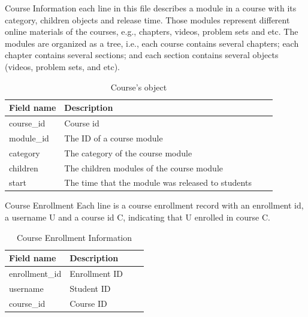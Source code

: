\documentclass[10pt]{beamer}
\begin{document}
    \begin{frame}{Course Information}
        each line in this file describes a module in a course with its category, 
        children objects and release time. Those modules represent different 
        online materials of the courses, e.g., chapters, videos, problem sets 
        and etc. The modules are organized as a tree, i.e., 
        each course contains several chapters; each chapter contains several 
        sections; and each section contains several objects 
        (videos, problem sets, and etc).

        \begin{table}
            \caption{\label{tab:course-object}Course's object}
            \begin{tabular}{l*{2}{l}r}
                Field name  & Description \\
                \hline
                course\_id  & Course id \\
                module\_id  & The ID of a course module \\
                category    & The category of the course module \\
                children    & The children modules of the course module \\
                start       & The time that the module was released to students \\
            \end{tabular}
        \end{table}
    \end{frame}

    \begin{frame}[fragile]{Course Enrollment}
        Each line is a course enrollment record with an enrollment id, 
        a username U and a course id C, indicating that U enrolled in course C.

        \begin{table}
            \caption{\label{tab:course-enrollment}Course Enrollment Information}
            \begin{tabular}{l*{2}{l}r}
                Field name      & Description \\
                \hline
                enrollment\_id  & Enrollment ID \\
                username        & Student ID \\
                course\_id      & Course ID \\
            \end{tabular}
        \end{table}
    \end{frame}
\end{document}
